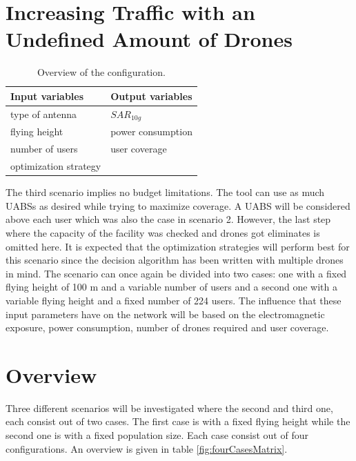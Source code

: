 \section{Increasing Traffic with an Undefined Amount of Drones}
\begin{table}[!htb]
      \centering
            \begin{tabular}{|l|l|}
            \hline
            \textbf{Input variables  }              & \textbf{Output variables}          \\   \hline 
            type of antenna                & $SAR_{10g}$               \\ 
            flying height                   & power consumption             \\ 
            number of users                & user coverage            \\ 
            optimization strategy           & \\
            \hline
            \end{tabular}
        \caption{Overview of the configuration.}
        \label{table:confOverviewScenario2}
\end{table}

The third scenario implies no budget limitations. The tool can use as much \gls{UABS}s as desired while trying to maximize coverage. 
A \gls{UABS} will be considered above each user which was also the case in scenario 2. However, the last step where the capacity of the facility
was checked and drones got eliminates is omitted here. It is expected that the optimization strategies will perform best for this scenario since the decision algorithm has been written with multiple drones in mind.
The scenario can once again be divided into two cases: one with a fixed flying height of 100 m and a variable number of users and a second one with 
a variable flying  height and a fixed number of 224 users.
The influence that these input parameters have on the network will be based on the electromagnetic exposure, power consumption, number of drones required and user coverage.

\section{Overview}
Three different scenarios will be investigated where the second and third one, each consist out of two cases. The first case is with a fixed flying height while 
the second one is with a fixed population size. Each case consist out of four configurations. An overview is given in table \ref{fig:fourCasesMatrix}.

